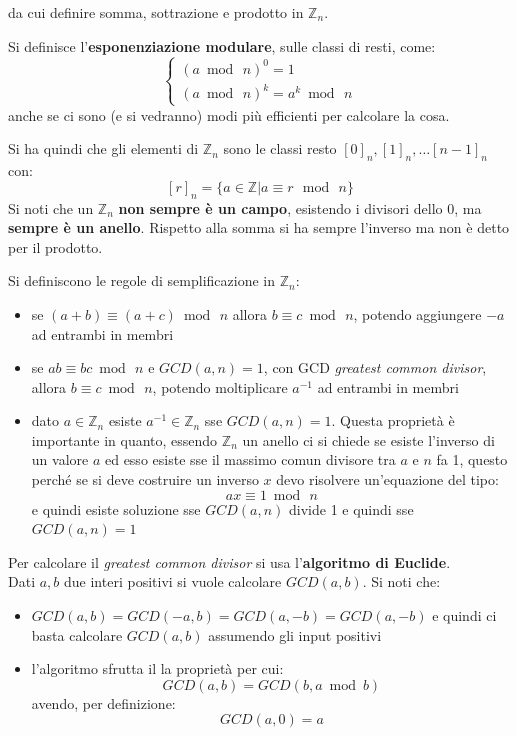 \documentclass[a4paper,12pt, oneside]{book}
\begin{document}
da cui definire somma, sottrazione e prodotto in $\mathbb{Z}_n$.
\begin{definizione}
  Si definisce l'\textbf{esponenziazione modulare}, sulle classi di resti, come:
  \[
    \begin{cases}
      (a\bmod \,n)^0=1\\
      (a\bmod \,n)^k = a^k\bmod\,n
    \end{cases}
  \]
  anche se ci sono (e si vedranno) modi più efficienti per calcolare la cosa.
\end{definizione}
Si ha quindi che gli elementi di $\mathbb{Z}_n$ sono le classi resto
$[0]_n,[1]_n,\ldots [n-1]_n$ con:
\[[r]_n=\{a\in\mathbb{Z}|a\equiv r\,\bmod\,n \}\]
Si noti che un $\mathbb{Z}_n$ \textbf{non sempre è un campo}, esistendo i
divisori dello 0, ma \textbf{sempre è un anello}. Rispetto alla somma si ha
sempre l'inverso ma non è detto per il prodotto. 
\begin{definizione}
  Si definiscono le regole di semplificazione in $\mathbb{Z}_n$:
  \begin{itemize}
    \item se $(a+b)\equiv (a+c)\bmod\,n$ allora $b\equiv c\bmod\,n$, potendo
    aggiungere $-a$ ad entrambi in membri
    \item se $ab\equiv bc\bmod\,n$ e $GCD(a,n)=1$, con GCD \textit{greatest
      common divisor}, allora $b\equiv c\bmod\,n$, potendo
    moltiplicare $a^{-1}$ ad entrambi in membri
    \item dato $a\in\mathbb{Z}_n$ esiste $a^{-1}\in\mathbb{Z}_n$ sse
    $GCD(a,n)=1$. Questa proprietà è importante in quanto, essendo
    $\mathbb{Z}_n$ un anello ci si chiede se esiste l'inverso di un valore $a$
    ed esso esiste sse il massimo comun divisore tra $a$ e $n$ fa 1, questo
    perché se si deve costruire un inverso $x$ devo risolvere un'equazione del
    tipo: 
    \[ax\equiv 1\bmod\,n\]
    e quindi esiste soluzione sse $GCD(a,n)$ divide 1 e quindi sse $GCD(a,n)=1$
  \end{itemize}
\end{definizione}
Per calcolare il \textit{greatest common divisor} si usa l'\textbf{algoritmo di
  Euclide}.\\
Dati $a,b$ due interi positivi si vuole calcolare $GCD(a,b)$. Si noti che:
\begin{itemize}
  \item $GCD(a,b)=GCD(-a,b)=GCD(a,-b)=GCD(a,-b)$ e quindi ci basta calcolare
  $GCD(a,b)$ assumendo gli input positivi
  \item l'algoritmo sfrutta il la proprietà per cui:
  \[GCD(a,b)=GCD(b,a\bmod b)\]
  avendo, per definizione:
  \[GCD(a,0)=a\]
\end{itemize}
\end{document}
